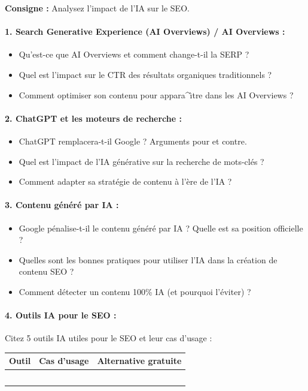 \documentclass[12pt,a4paper]{report}
\begin{document}
\textbf{Consigne :} Analysez l'impact de l'IA sur le SEO.

\paragraph{1. Search Generative Experience (AI Overviews) / AI Overviews :}
\begin{itemize}
    \item Qu'est-ce que AI Overviews et comment change-t-il la SERP ?
    \item Quel est l'impact sur le CTR des r\'{e}sultats organiques traditionnels ?
    \item Comment optimiser son contenu pour appara^{\^\i}tre dans les AI Overviews ?
\end{itemize}

\paragraph{2. ChatGPT et les moteurs de recherche :}
\begin{itemize}
    \item ChatGPT remplacera-t-il Google ? Arguments pour et contre.
    \item Quel est l'impact de l'IA g\'{e}n\'{e}rative sur la recherche de mots-cl\'{e}s ?
    \item Comment adapter sa strat\'{e}gie de contenu \`{a} l'\`{e}re de l'IA ?
\end{itemize}

\paragraph{3. Contenu g\'{e}n\'{e}r\'{e} par IA :}
\begin{itemize}
    \item Google p\'{e}nalise-t-il le contenu g\'{e}n\'{e}r\'{e} par IA ? Quelle est sa position officielle ?
    \item Quelles sont les bonnes pratiques pour utiliser l'IA dans la cr\'{e}ation de contenu SEO ?
    \item Comment d\'{e}tecter un contenu 100\% IA (et pourquoi l'\'{e}viter) ?
\end{itemize}

\paragraph{4. Outils IA pour le SEO :}
Citez 5 outils IA utiles pour le SEO et leur cas d'usage :
\begin{longtable}{lll}
\toprule
Outil & Cas d'usage & Alternative gratuite \\
\midrule
\endhead
\bottomrule
\endfoot
& & \\
& & \\
& & \\
& & \\
& & \\
\bottomrule
\end{longtable}
\end{document}
